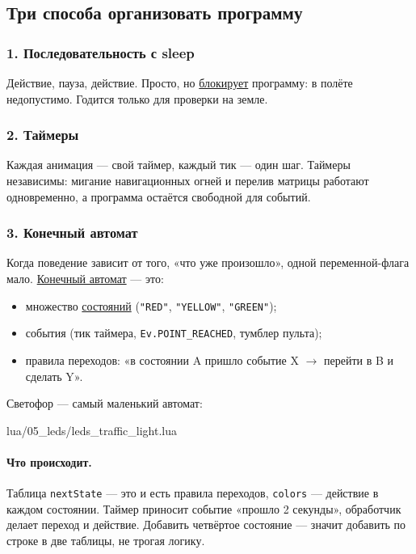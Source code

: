 \subsection{Три способа организовать программу}

\subsubsection{1. Последовательность с sleep}
Действие, пауза, действие. Просто, но \hyperlink{term:blocking}{блокирует} программу: в полёте недопустимо. Годится только для проверки на земле.

\subsubsection{2. Таймеры}
Каждая анимация --- свой таймер, каждый тик --- один шаг. Таймеры независимы: мигание навигационных огней и перелив матрицы работают одновременно, а программа остаётся свободной для событий.

\subsubsection{3. Конечный автомат}
Когда поведение зависит от того, «что уже произошло», одной переменной-флага мало. \hyperlink{term:automaton}{Конечный автомат} --- это:
\begin{itemize}
    \item множество \hyperlink{term:state}{состояний} (\verb|"RED"|, \verb|"YELLOW"|, \verb|"GREEN"|);
    \item события (тик таймера, \verb|Ev.POINT_REACHED|, тумблер пульта);
    \item правила переходов: «в состоянии A пришло событие X $\to$ перейти в B и сделать Y».
\end{itemize}

Светофор --- самый маленький автомат:

\begin{codefile}{lua/05_leds/leds_traffic_light.lua}
\end{codefile}

\paragraph{Что происходит.} Таблица \verb|nextState| --- это и есть правила переходов, \verb|colors| --- действие в каждом состоянии. Таймер приносит событие «прошло 2 секунды», обработчик делает переход и действие. Добавить четвёртое состояние --- значит добавить по строке в две таблицы, не трогая логику.

